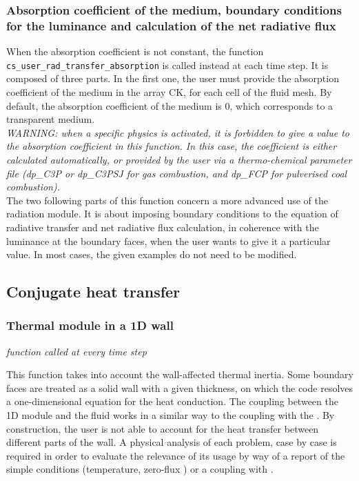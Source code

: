 \subsubsection{Absorption coefficient of the medium, boundary conditions
   for the luminance and calculation of the net radiative flux}

When the absorption coefficient is not constant, the function
\texttt{cs\_user\_rad\_transfer\_absorption} is called instead at each time
step. It is composed of three parts. In the first one, the user
must provide the absorption coefficient of the medium in the array CK,
for each cell of the fluid mesh. By default, the absorption coefficient
of the medium is 0, which corresponds to a transparent medium.\\

{\em WARNING: when a specific physics is activated, it is forbidden to
give a value to the absorption coefficient in this function. In this
case, the coefficient is either calculated automatically, or provided by the user {\em via} a
thermo-chemical parameter file (dp\_C3P or dp\_C3PSJ for gas combustion,
and dp\_FCP for pulverised coal combustion).}\\

\noindent
The two following parts of this function concern a more advanced use
of the radiation module. It is about imposing boundary conditions to the
equation of radiative transfer and net radiative flux calculation, in
coherence with the luminance at the boundary faces, when the user wants
to give it a particular value. In most cases, the given examples do not
need to be modified.

\subsection{Conjugate heat transfer}

\subsubsection{Thermal module in a 1D wall}

\noindent
\textit{function called at every time step}

This function takes into account the wall-affected thermal inertia.
 Some boundary faces are treated as a solid wall with a given thickness, on
 which the code resolves a one-dimensional equation for the heat conduction.
 The coupling between the 1D module and the fluid works in a similar way to
 the coupling with the \syrthes. By construction, the user is not able to
 account for the heat transfer between different parts of the wall. A physical
 analysis of each problem, case by case is required in order to evaluate the relevance
 of its usage by way of a report of the simple conditions (temperature, zero-flux
 ) or a coupling with \syrthes.\\

